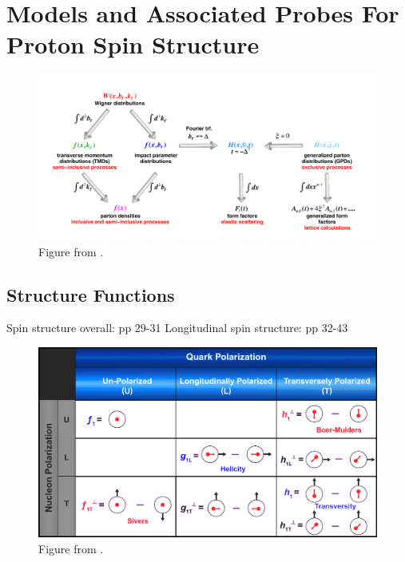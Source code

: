 \chapter{Models and Associated Probes For Proton Spin Structure}
\label{ch:modeling_proton_spin}
\begin{figure}
  \centering
  \includegraphics[width=\linewidth]{./figures/pdf_distributions_invariants.png}
  \caption{
    Figure from \cite{Accardi2012}.
  }
  \label{fig:invariants_observables_pdf}

\end{figure}
\section{ Structure Functions}
Spin structure overall: \cite{Accardi2012} pp 29-31
Longitudinal spin structure: \cite{Accardi2012} pp 32-43

\begin{figure}
  \centering
  \includegraphics[width=\linewidth]{./figures/leading_twist_polarization_config.png}
  \caption{
    Figure from \cite{Accardi2012}.
  }
  \label{fig:leadings_twist_probes}
\end{figure}

